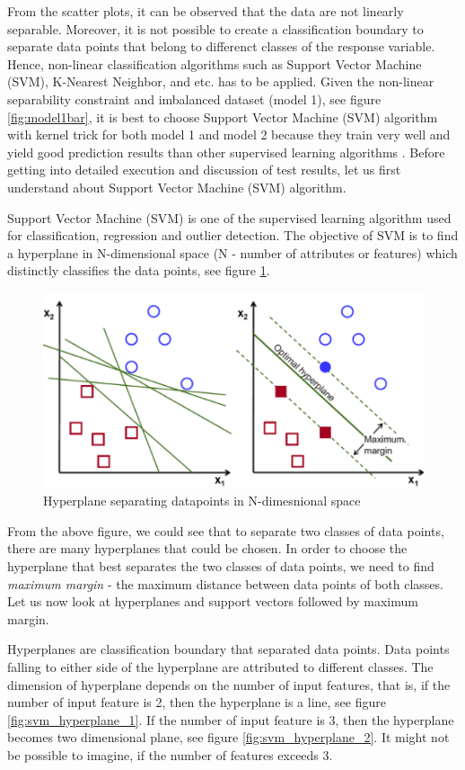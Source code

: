 \documentclass[format=sigconf]{acmart}
\begin{document}
From the scatter plots, it can be observed that the data are not linearly separable. Moreover, it is not possible to create a classification 
boundary to separate data points that belong to differenct classes of the response variable. Hence, non-linear classification 
algorithms such as Support Vector Machine (SVM), K-Nearest Neighbor, and etc. has to be applied. Given the non-linear 
separability constraint and imbalanced dataset (model 1), see figure \ref{fig:model1bar}, it is best to choose Support Vector Machine (SVM) 
algorithm with kernel trick for both model 1 and model 2 because they train very well and yield good prediction results than other supervised learning 
algorithms \cite{imam2006z}. Before getting into detailed execution and discussion of test results, let us first understand about 
Support Vector Machine (SVM) algorithm.

Support Vector Machine (SVM) is one of the supervised learning algorithm used for classification, regression and outlier detection.
The objective of SVM is to find a hyperplane in N-dimensional space (N - number of attributes or features) which distinctly classifies
the data points, see figure \ref{fig:svm_1}.
\begin{figure}[H]
    \centering
    \includegraphics[scale=0.25]{svm_1.png}
    \caption{Hyperplane separating datapoints in N-dimesnional space}
    \label{fig:svm_1}
\end{figure}
From the above figure, we could see that to separate two classes of data points, there are many hyperplanes that could be chosen.
In order to choose the hyperplane that best separates the two classes of data points, we need to find \textit{maximum margin} - the
maximum distance between data points of both classes. Let us now look at hyperplanes and support vectors followed by maximum margin.

Hyperplanes are classification boundary that separated data points. Data points falling to either side of the hyperplane are 
attributed to different classes. The dimension of hyperplane depends on the number of input features, that is, if the number of 
input feature is 2, then the hyperplane is a line, see figure \ref{fig:svm_hyperplane_1}. If the number of input feature is 3, then 
the hyperplane becomes two dimensional plane, see figure \ref{fig:svm_hyperplane_2}. It might not be possible to imagine, if the 
number of features exceeds 3.
\end{document}
